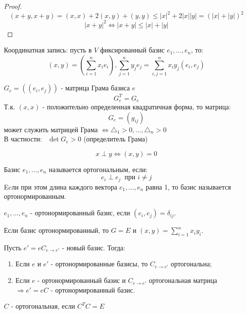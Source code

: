 \begin{proof}
    $$(x+y, x+y) = (x, x) + 2(x, y) + (y, y) \leq |x|^2 + 2|x||y| = (|x|+|y|)^2$$
    $$|x+y|^2 \Longleftrightarrow |x+y| \leq |x| + |y|$$  
\end{proof}
Координатная запись: пусть в $V$ фиксированный базис $e_1,...,e_n$, то: 
$$(x,y) = (\sum \limits_{i=1}^nx_ie_i), \sum \limits_{j=1}^ny_je_j = \sum \limits_{i,j=1}^nx_iy_j(e_i,e_j)$$
\begin{definition}
    $G_e = ((e_i,e_j))$ - матрица Грама базиса $e$
    $$G_e^T = G_e$$ 
    Т.к. $(x,x)$ - положительно определенная квадратичная форма, то матрица: 
    $$G_e = (g_{ij})$$ 
    может служить матрицей Грама $\Longleftrightarrow \triangle_1 >0,...,\triangle_n > 0$ \\
    В частности: \ $\det G_e >0$ (определитель Грама)   
\end{definition}
\begin{center}
\end{center}
\begin{definition}
    $$x \perp y \Longleftrightarrow (x,y) = 0$$ 
\end{definition}
\begin{definition}
    Базис $e_1,...,e_n$ называется ортогональным, если: 
    $$e_i \perp e_j \ \text{ при } i \neq j$$
    Ecли при этом длина каждого вектора $e_1,...,e_n$ равна 1, то базис называется ортонормированным.
\end{definition}
\begin{consequense}
    $e_1,...,e_n$ - ортонормированный базис, если $(e_i,e_j) = \delta_{ij}$.  
\end{consequense}
\begin{consequense}
    Если базис ортонормированный, то $G = E$ и $(x,y) = \sum \limits_{i=1}^nx_iy_i$.
\end{consequense}
\begin{theorem} Пусть $e' = eC_{e\to e'}$ - новый базис. Тогда: 
    \begin{enumerate}
        \item Если $e$ и $e'$ - ортонормированные базисы, то $C_{e \to e'}$ ортогональна;
        \item Если $e$ - ортонормированный базис и $C_{e \to e'}$ ортогональная матрица $\Longrightarrow e' = eC$ - ортонормированный базис.
    \end{enumerate}
\end{theorem}
\begin{remark}
    $C$ - ортогональная, если $C^TC = E$  
\end{remark} 

